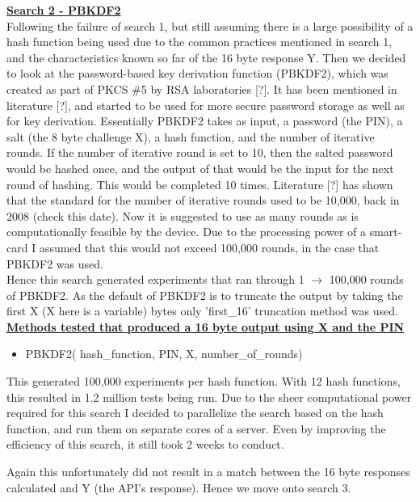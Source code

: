 \documentclass[bsc,frontabs,twoside,singlespacing,parskip,deptreport]{infthesis}     %
\begin{document}
\textbf{\underline{Search 2 - PBKDF2}}\\
Following the failure of search 1, but still assuming there is a large possibility of a hash function being used due to the common practices mentioned in search 1, and the characteristics known so far of the 16 byte response Y. Then we decided to look at the password-based key derivation function (PBKDF2), which was created as part of PKCS \#5 by RSA laboratories [?]. It has been mentioned in literature [?], and started to be used for more secure password storage as well as for key derivation. Essentially PBKDF2 takes as input, a password (the PIN), a salt (the 8 byte challenge X), a hash function, and the number of iterative rounds. If the number of iterative round is set to 10, then the salted password would be hashed once, and the output of that would be the input for the next round of hashing. This would be completed 10 times. Literature [?] has shown that the standard for the number of iterative rounds used to be 10,000, back in 2008 (check this date). Now it is suggested to use as many rounds as is computationally feasible by the device. Due to the processing power of a smart-card I assumed that this would not exceed 100,000 rounds, in the case that PBKDF2 was used.\\

Hence this search generated experiments that ran through 1 $\rightarrow$ 100,000 rounds of PBKDF2. As the default of PBKDF2 is to truncate the output by taking the first X (X here is a variable) bytes only 'first\_16' truncation method was used.\\

\underline{\textbf{Methods tested that produced a 16 byte output using X and the PIN}}
\begin{itemize}
\item PBKDF2( hash\_function, PIN, X, number\_of\_rounds)
\end{itemize}

This generated 100,000 experiments per hash function. With 12 hash functions, this resulted in 1.2 million tests being run. Due to the sheer computational power required for this search I decided to parallelize the search based on the hash function, and run them on separate cores of a server. Even by improving the efficiency of this search, it still took 2 weeks to conduct.

Again this unfortunately did not result in a match between the 16 byte responses calculated and Y (the API's response). Hence we move onto search 3.\\
\end{document}

